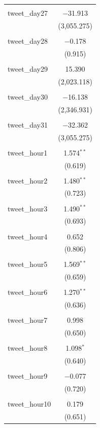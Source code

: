 \documentclass{article}
\begin{document}
\begin{longtable}{@{\extracolsep{10pt}}lc}
  & \\ 
 tweet\_day27 & $-$31.913 \\ 
  & (3,055.275) \\ 
  & \\ 
 tweet\_day28 & $-$0.178 \\ 
  & (0.915) \\ 
  & \\ 
 tweet\_day29 & 15.390 \\ 
  & (2,023.118) \\ 
  & \\ 
 tweet\_day30 & $-$16.138 \\ 
  & (2,346.931) \\ 
  & \\ 
 tweet\_day31 & $-$32.362 \\ 
  & (3,055.275) \\ 
  & \\ 
 tweet\_hour1 & 1.574$^{**}$ \\ 
  & (0.619) \\ 
  & \\ 
 tweet\_hour2 & 1.480$^{**}$ \\ 
  & (0.723) \\ 
  & \\ 
 tweet\_hour3 & 1.490$^{**}$ \\ 
  & (0.693) \\ 
  & \\ 
 tweet\_hour4 & 0.652 \\ 
  & (0.806) \\ 
  & \\ 
 tweet\_hour5 & 1.569$^{**}$ \\ 
  & (0.659) \\ 
  & \\ 
 tweet\_hour6 & 1.270$^{**}$ \\ 
  & (0.636) \\ 
  & \\ 
 tweet\_hour7 & 0.998 \\ 
  & (0.650) \\ 
  & \\ 
 tweet\_hour8 & 1.098$^{*}$ \\ 
  & (0.640) \\ 
  & \\ 
 tweet\_hour9 & $-$0.077 \\ 
  & (0.720) \\ 
  & \\ 
 tweet\_hour10 & 0.179 \\ 
  & (0.651) \\ 

\end{longtable}
\end{document}
